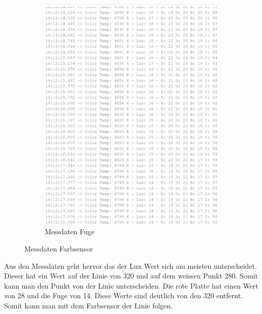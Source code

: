 \begin{figure}[H]
\begin{subfigure}{0.35\textwidth}
        \includegraphics[width=\linewidth]{img/sensortest/MD_Fuge_101ms.png}
        \caption{Messdaten Fuge}
        \label{fig:MDFarbsensorFuge}
    \end{subfigure}

    \caption{Messdaten Farbsensor}
    \label{fig:Testanordnungen}
\end{figure}

Aus den Messdaten geht hervor das der Lux Wert sich am meisten unterscheidet. Dieser hat ein Wert auf der Linie von 320 und auf dem weissen Punkt 280. Somit kann man den Punkt von der Linie unterscheiden. Die rote Platte hat einen Wert von 28 und die Fuge von 14. Diese Werte sind deutlich von den 320 entfernt. Somit kann man mit dem Farbsensor der Linie folgen.

